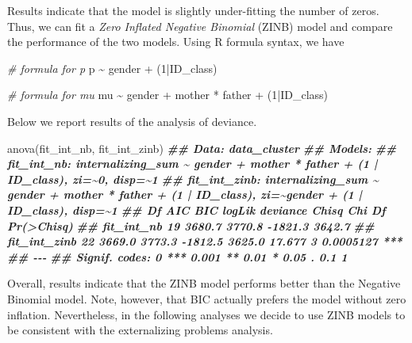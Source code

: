 \documentclass[
]{book}
\newenvironment{Shaded}{\begin{snugshade}}{\end{snugshade}}
\newcommand{\CommentTok}[1]{\textcolor[rgb]{0.56,0.35,0.01}{\textit{#1}}}
\newcommand{\DecValTok}[1]{\textcolor[rgb]{0.00,0.00,0.81}{#1}}
\newcommand{\DocumentationTok}[1]{\textcolor[rgb]{0.56,0.35,0.01}{\textbf{\textit{#1}}}}
\newcommand{\FunctionTok}[1]{\textcolor[rgb]{0.00,0.00,0.00}{#1}}
\newcommand{\NormalTok}[1]{#1}
\newcommand{\SpecialCharTok}[1]{\textcolor[rgb]{0.00,0.00,0.00}{#1}}
\begin{document}
Results indicate that the model is slightly under-fitting the number of zeros. Thus, we can fit a \emph{Zero Inflated Negative Binomial} (ZINB) model and compare the performance of the two models. Using R formula syntax, we have

\begin{Shaded}
\begin{Highlighting}[]
\CommentTok{\# formula for p}
\NormalTok{p }\SpecialCharTok{\textasciitilde{}}\NormalTok{ gender }\SpecialCharTok{+}\NormalTok{ (}\DecValTok{1}\SpecialCharTok{|}\NormalTok{ID\_class)}

\CommentTok{\# formula for mu}
\NormalTok{mu }\SpecialCharTok{\textasciitilde{}}\NormalTok{ gender }\SpecialCharTok{+}\NormalTok{ mother }\SpecialCharTok{*}\NormalTok{ father }\SpecialCharTok{+}\NormalTok{ (}\DecValTok{1}\SpecialCharTok{|}\NormalTok{ID\_class)}
\end{Highlighting}
\end{Shaded}

Below we report results of the analysis of deviance.

\begin{Shaded}
\begin{Highlighting}[]
\FunctionTok{anova}\NormalTok{(fit\_int\_nb, fit\_int\_zinb)}
\DocumentationTok{\#\# Data: data\_cluster}
\DocumentationTok{\#\# Models:}
\DocumentationTok{\#\# fit\_int\_nb: internalizing\_sum \textasciitilde{} gender + mother * father + (1 | ID\_class), zi=\textasciitilde{}0, disp=\textasciitilde{}1}
\DocumentationTok{\#\# fit\_int\_zinb: internalizing\_sum \textasciitilde{} gender + mother * father + (1 | ID\_class), zi=\textasciitilde{}gender + (1 | ID\_class), disp=\textasciitilde{}1}
\DocumentationTok{\#\#              Df    AIC    BIC  logLik deviance  Chisq Chi Df Pr(\textgreater{}Chisq)    }
\DocumentationTok{\#\# fit\_int\_nb   19 3680.7 3770.8 {-}1821.3   3642.7                             }
\DocumentationTok{\#\# fit\_int\_zinb 22 3669.0 3773.3 {-}1812.5   3625.0 17.677      3  0.0005127 ***}
\DocumentationTok{\#\# {-}{-}{-}}
\DocumentationTok{\#\# Signif. codes:  0 \textquotesingle{}***\textquotesingle{} 0.001 \textquotesingle{}**\textquotesingle{} 0.01 \textquotesingle{}*\textquotesingle{} 0.05 \textquotesingle{}.\textquotesingle{} 0.1 \textquotesingle{} \textquotesingle{} 1}
\end{Highlighting}
\end{Shaded}

Overall, results indicate that the ZINB model performs better than the Negative Binomial model. Note, however, that BIC actually prefers the model without zero inflation. Nevertheless, in the following analyses we decide to use ZINB models to be consistent with the externalizing problems analysis.
\end{document}
